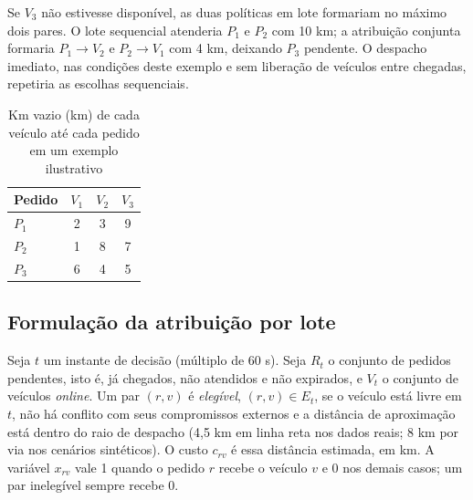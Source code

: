 Se $V_3$ não estivesse disponível, as duas políticas em lote formariam no máximo dois pares. O lote sequencial atenderia $P_1$ e $P_2$ com 10 km; a atribuição conjunta formaria $P_1\to V_2$ e $P_2\to V_1$ com 4 km, deixando $P_3$ pendente. O despacho imediato, nas condições deste exemplo e sem liberação de veículos entre chegadas, repetiria as escolhas sequenciais.

\begin{table}[!htb]
\caption{Km vazio (km) de cada veículo até cada pedido em um exemplo ilustrativo}\label{tab:exemplo}
\centering\fontetabela
\begin{tabular}{|l|c|c|c|}
\hline
\textbf{Pedido} & \textbf{$V_1$} & \textbf{$V_2$} & \textbf{$V_3$} \\
\hline
$P_1$ & 2 & 3 & 9 \\
\hline
$P_2$ & 1 & 8 & 7 \\
\hline
$P_3$ & 6 & 4 & 5 \\
\hline
\end{tabular}
\end{table}

\subsection{Formulação da atribuição por lote}\label{sec:formulacao}

Seja $t$ um instante de decisão (múltiplo de 60 s). Seja $R_t$ o conjunto de pedidos pendentes, isto é, já chegados, não atendidos e não expirados, e $V_t$ o conjunto de veículos \emph{online}. Um par $(r,v)$ é \emph{elegível}, $(r,v)\in E_t$, se o veículo está livre em $t$, não há conflito com seus compromissos externos e a distância de aproximação está dentro do raio de despacho (4,5 km em linha reta nos dados reais; 8 km por via nos cenários sintéticos). O custo $c_{rv}$ é essa distância estimada, em km. A variável $x_{rv}$ vale 1 quando o pedido $r$ recebe o veículo $v$ e 0 nos demais casos; um par inelegível sempre recebe 0.

